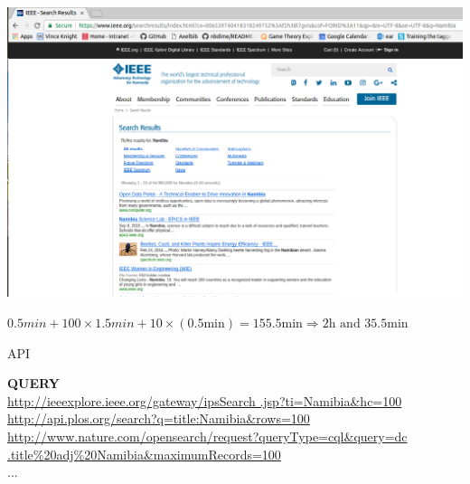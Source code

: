 \documentclass{beamer}
\begin{document}
\begin{frame}
\begin{center}
    \includegraphics[width=1\textwidth]{static/ieee_manual.png}
\end{center}
\end{frame}

\begin{frame}
\begin{center}
\color{yellow!79}\Large{$0.5 min + \textrm{100} \times 1.5 min + 10 \times (0.5
\textrm{min})= 155.5 \textrm{min} \Rightarrow 2 \textrm{h} \textrm{ and } 35.5
\textrm{min}$}
\end{center}
\end{frame}

\begin{frame}
\begin{center}
\Huge{API}
\end{center}
\end{frame}

\begin{frame}[fragile]
    \begin{center}
    \textbf{QUERY} \\
    \vspace{3mm}
    \small{\url{http://ieeexplore.ieee.org/gateway/ipsSearch
    .jsp?ti=Namibia&hc=100}} \\
    \pause
    \vspace{10mm}
    \small{\url{http://api.plos.org/search?q=title:Namibia&rows=100}} \\
    \pause
    \vspace{10mm}
    \small{\url{http://www.nature.com/opensearch/request?queryType=cql&query=dc
    .title%
    \small{...}
    \end{center}
\end{frame}
\end{document}

